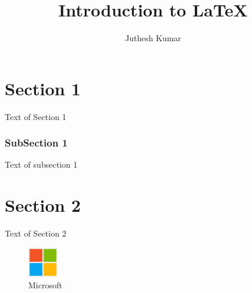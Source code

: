 \documentclass{report}
\begin{document}
    \title{Introduction to \LaTeX{}}
    \author{Juthesh Kumar}

    \maketitle

    \tableofcontents

    \chapter{Section 1}
	Text of Section 1
	\subsection{SubSection 1}
	Text of subsection 1
	\chapter{Section 2}
	Text of Section 2
    \begin{figure}[h]
    	\includegraphics[width=50px]{Microsoft_logo.png}
        \centering
        \caption{Microsoft}
    \end{figure}
\end{document}
